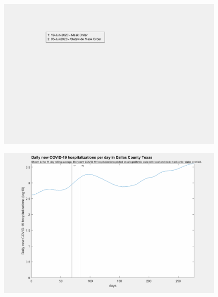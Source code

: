 \documentclass[]{article}
\begin{document}
\begin{figure}[!h]
	\includegraphics[width=\linewidth]{legends/dallas_mask_order_legend.png}
	\caption{}
	\label{fig:legends/dallas_mask_order_legendLabel}
\end{figure}

\begin{figure}[!h]
	\includegraphics[width=\linewidth]{images/dallas_mask_order_hospitalizations_log.png}
	\caption{}
	\label{fig:images/dallas_mask_order_hospitalizations_logLabel}
\end{figure}
\end{document}
